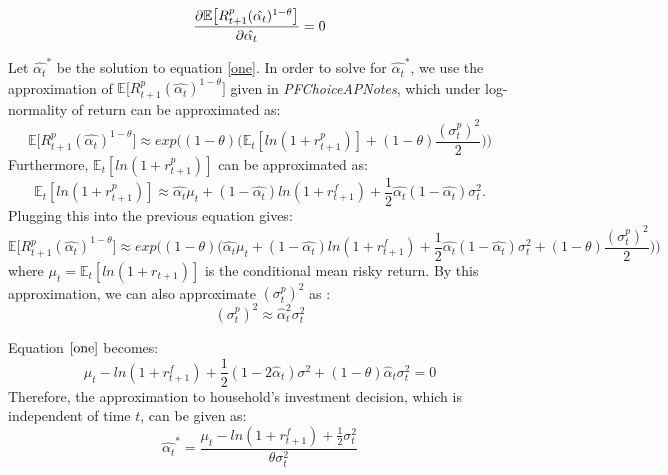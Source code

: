 \documentclass[12pt,a4paper]{article}
\begin{document}
\begin{equation}\label{one}
    \pdv{\mathbb{E}\big[R_{t+1}^p(\hat{\alpha_t})^{1-\theta}\big]}{\hat{\alpha_t}}=0
\end{equation}
 
Let $\hat{\alpha_t}^{*}$ be the solution to equation \eqref{one}. In order to solve for  $\hat{\alpha_t}^{*}$, we use the approximation of $\mathbb{E}\big[R_{t+1}^p(\hat{\alpha_t})^{1-\theta}\big]$ given in  \textit{PFChoiceAPNotes}, which under log-normality of return can be approximated as: 
\begin{equation*}
  \mathbb{E}\big[R_{t+1}^p(\hat{\alpha_t})^{1-\theta}\big] \approx  exp\bigg((1-\theta)\bigg(\mathbb{E}_t[ln(1+r^p_{t+1})]+(1-\theta)\frac{(\sigma_t^p)^2}{2}\bigg) \bigg)
\end{equation*}
Furthermore, 
 $\mathbb{E}_t[ln(1+r^p_{t+1})]$ can be approximated as:
\begin{equation*}
    \mathbb{E}_t[ln(1+r^p_{t+1})]\approx \hat{\alpha_t}\mu_t +(1-\hat{\alpha_t})ln(1+r^f_{t+1})+\frac{1}{2}\hat{\alpha_t}(1-\hat{\alpha_t})\sigma_t^2.
\end{equation*}
Plugging this into the previous equation gives: 
\begin{equation*}
 \mathbb{E}\big[R_{t+1}^p(\hat{\alpha_t})^{1-\theta}\big]\approx exp\bigg((1-\theta)\bigg(\hat{\alpha_t}\mu_t +(1-\hat{\alpha_t})ln(1+r^f_{t+1})+\frac{1}{2}\hat{\alpha_t}(1-\hat{\alpha_t})\sigma_t^2+(1-\theta)\frac{(\sigma_t^p)^2}{2}\bigg) \bigg)
\end{equation*}
where $\mu_t=\mathbb{E}_t[ln(1+r_{t+1})]$ is the conditional mean risky return. By this approximation, we can also approximate $(\sigma_t^p)^2$ as :
\begin{equation*}
    (\sigma_t^p)^2\approx\hat{\alpha}_t^2\sigma_t^2
\end{equation*}

Equation $\eqref{one}$ becomes: 
\begin{equation*}
 \mu_t-ln(1+r^f_{t+1})+\frac{1}{2}(1-2\hat{\alpha}_t)\sigma^2+(1-\theta)\hat{\alpha}_t\sigma_t^2=0
\end{equation*}
Therefore, the approximation to household's investment decision, which is independent of time $t$, can be given as: 
\begin{equation*}
    \hat{\alpha_t}^{*}=\frac{\mu_t-ln(1+r^f_{t+1})+\frac{1}{2}\sigma_t^2}{\theta\sigma_t^2} 
\end{equation*}
\end{document}
